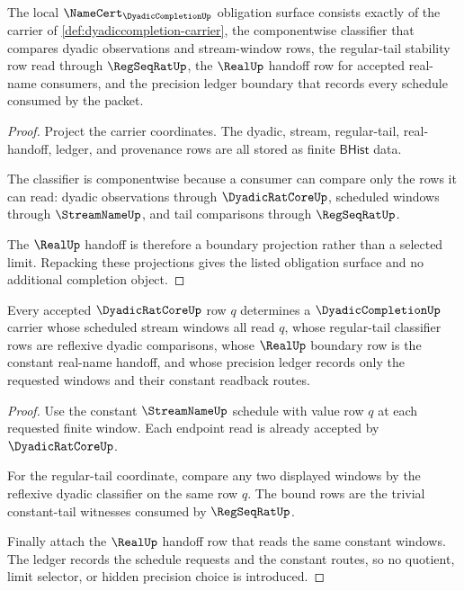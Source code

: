 \begin{theorem}
\label{thm:dyadiccompletion-namecert-obligation-surface}
The local $\NameCert_{\DyadicCompletionUp}$ obligation surface consists exactly
of the carrier of \autoref{def:dyadiccompletion-carrier}, the componentwise
classifier that compares dyadic observations and stream-window rows, the
regular-tail stability row read through $\RegSeqRatUp$, the $\RealUp$ handoff
row for accepted real-name consumers, and the precision ledger boundary that
records every schedule consumed by the packet.
\end{theorem}
\begin{proof}
Project the carrier coordinates. The dyadic, stream, regular-tail, real-handoff,
ledger, and provenance rows are all stored as finite $\mathsf{BHist}$ data.

The classifier is componentwise because a consumer can compare only the rows it
can read: dyadic observations through $\DyadicRatCoreUp$, scheduled windows
through $\StreamNameUp$, and tail comparisons through $\RegSeqRatUp$.

The $\RealUp$ handoff is therefore a boundary projection rather than a selected
limit. Repacking these projections gives the listed obligation surface and no
additional completion object.
\end{proof}

\begin{theorem}
\label{thm:dyadiccompletion-constant-embedding}
Every accepted $\DyadicRatCoreUp$ row $q$ determines a $\DyadicCompletionUp$
carrier whose scheduled stream windows all read $q$, whose regular-tail
classifier rows are reflexive dyadic comparisons, whose $\RealUp$ boundary row
is the constant real-name handoff, and whose precision ledger records only the
requested windows and their constant readback routes.
\end{theorem}
\begin{proof}
Use the constant $\StreamNameUp$ schedule with value row $q$ at each requested
finite window. Each endpoint read is already accepted by $\DyadicRatCoreUp$.

For the regular-tail coordinate, compare any two displayed windows by the
reflexive dyadic classifier on the same row $q$. The bound rows are the trivial
constant-tail witnesses consumed by $\RegSeqRatUp$.

Finally attach the $\RealUp$ handoff row that reads the same constant windows.
The ledger records the schedule requests and the constant routes, so no
quotient, limit selector, or hidden precision choice is introduced.
\end{proof}

